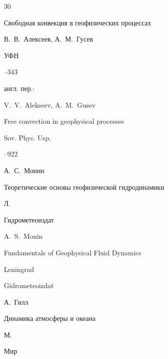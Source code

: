 {\begin{thebibliography}{30}

\paper Свободная конвекция в геофизических процессах

\by В.~В.~Алексеев, А.~М.~Гусев

\jour УФН




--343


\transl англ. пер.:~


\by  V.~V.~Alekseev, A.~M.~Gusev 

\paper Free convection in geophysical processes

\jour Sov. Phys. Usp. 


–922 






\by А.~С.~Монин

\book Теоретические основы геофизической гидродинамики

\publaddr Л.

\publ Гидрометеоиздат



\misctransl

\by A.~S.~Monin 

\book Fundamentals of Geophysical Fluid Dynamics

\publaddr Leningrad

\publ Gidrometeoizdat












\by А.~Гилл

\book Динамика атмосферы и океана

\publaddr М.

\publ Мир



\end{thebibliography}}
